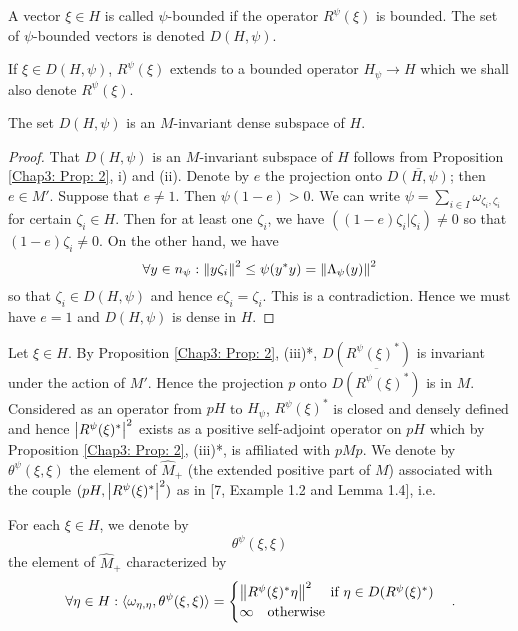 \begin{definition}
    A vector $\xi\in H$ is called $\psi$-bounded if the operator $R^\psi(\xi)$ is bounded. The set of $\psi$-bounded vectors is denoted $D(H,\psi)$.
\end{definition}
\begin{notation}
    If $\xi\in D(H,\psi)$, $R^\psi(\xi)$ extends to a bounded operator $H_\psi\to H$ which we shall also denote $R^\psi(\xi)$.
\end{notation}
\begin{proposition}
    The set $D(H,\psi)$ is an $M$-invariant dense subspace
    of $H$.
\end{proposition}
\begin{proof}
    That $D(H,\psi)$ is an $M$-invariant subspace of $H$ follows from Proposition \ref{Chap3: Prop: 2}, i) and (ii). Denote by $e$ the projection onto $\overline{D(H,\psi)}$; then $e\in M'$. Suppose that $e\neq 1$. Then $\psi(1-e)>0$. We can write $\psi=\sum_{i\in I}\omega_{\zeta_i,\zeta_i}$ for certain $\zeta_i\in H$. Then for at least one $\zeta_i$, we have $((1-e)\zeta_i|\zeta_i)\neq 0$ so that $(1-e)\zeta_i\neq 0$. On the other hand, we have
    \[
        \forall y\in n_\psi:\norm{y\zeta_i}^2\leq \psi(y^*y)=\norm{\Lambda_\psi(y)}^2
    \]
    so that $\zeta_i\in D(H,\psi)$ and hence $e\zeta_i = \zeta_i$. This is a contradiction. Hence we must have $e = 1$ and $D(H,\psi)$ is dense in $H$.
\end{proof}
Let $\xi\in H$. By Proposition \ref{Chap3: Prop: 2}, (iii)*, $D(R^\psi(\xi)^*)$ is invariant under the action of $M'$. Hence the projection $p$ onto $\overline{D(R^\psi(\xi)^*)}$ is in $M$. Considered as an operator from $pH$ to $H_\psi$, $R^\psi(\xi)^*$ is closed and densely defined and hence $\abs{R^\psi(\xi)^*}^2$ exists as a positive self-adjoint operator on $pH$ which by Proposition \ref{Chap3: Prop: 2}, (iii)*, is affiliated with $pMp$. We denote by $\theta^\psi(\xi,\xi)$ the element of $\widehat{M}_+$ (the extended positive part of $M$) associated with the couple $(pH,\abs{R^\psi(\xi)^*}^2)$ as in [7, Example 1.2 and Lemma 1.4], i.e.
\begin{definition}\label{Chap3: Def: 5}
    For each $\xi\in H$, we denote by
    \[
        \theta^\psi(\xi,\xi)
    \]
    the element of $\widehat{M}_+$ characterized by
    \begin{equation}
        \forall \eta\in H: \langle\omega_{\eta,\eta},\theta^\psi(\xi,\xi)\rangle=\begin{cases}
            \norm{R^\psi(\xi)^*\eta}^2\quad \text{ if } \eta\in D(R^\psi(\xi)^*) \\
            \infty\quad \text{otherwise}
        \end{cases}.
    \end{equation}
\end{definition}
